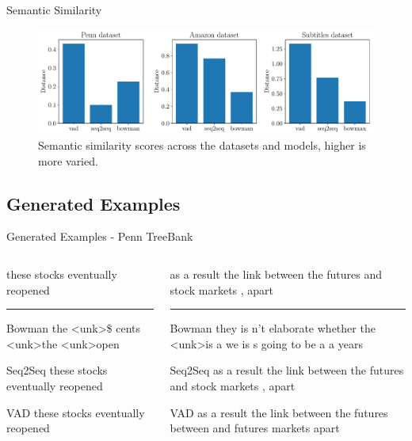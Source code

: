 \documentclass[aspectratio=169, 11pt]{beamer}
\begin{document}
\begin{frame}{Semantic Similarity}
  \begin{figure}[!ht]
    \centering
    \includegraphics[width=130mm]{results/semantic_similarity.pdf}
    \caption{Semantic similarity scores across the datasets and models, higher is more varied.\label{r:variance}}
    \end{figure}
\end{frame}

\subsection{Generated Examples}
\begin{frame}{Generated Examples - Penn TreeBank}
  \small
  \begin{columns}
    \begin{column}{0.5\textwidth}

        these stocks eventually reopened 

      \noindent\rule{\textwidth}{0.4pt}
      \begin{block}{Bowman}
        the  \textless{}unk\textgreater\space \$ cents \textless{}unk\textgreater\space the \textless{}unk\textgreater\space  open      
      \end{block}
      \begin{block}{Seq2Seq}
        these stocks eventually reopened 
      \end{block}
      \begin{block}{VAD}
        these stocks eventually reopened 
      \end{block}
    \end{column}
    \begin{column}{0.5\textwidth}
     
        as a result the link between the futures and stock markets , apart   
  
      \noindent\rule{\textwidth}{0.4pt}
      \begin{block}{Bowman}
        they is n't elaborate whether the \textless{}unk\textgreater\space  is a we is s going to be a a years
      \end{block}
      \begin{block}{Seq2Seq}
        as a result the link between the futures and stock markets , apart 
      \end{block}
      \begin{block}{VAD}
        as a result the link between the futures between and futures markets apart
      \end{block}
    \end{column}
  \end{columns}
\end{frame}
\end{document}

